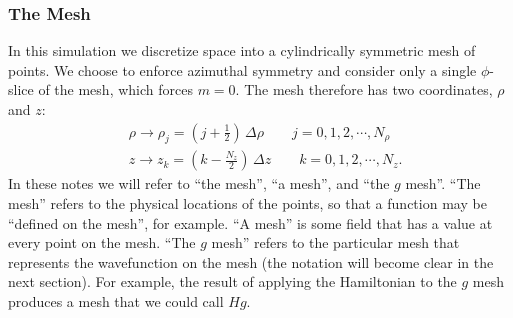 \documentclass[12pt]{article}
\numberwithin{equation}{section}
\begin{document}
\subsubsection{The Mesh}\label{sec:cylindrical_mesh}
In this simulation we discretize space into a cylindrically symmetric mesh of points. We choose to enforce azimuthal symmetry and consider only a single $\phi$-slice of the mesh, which forces $m=0$. The mesh therefore has two coordinates, $\rho$ and $z$:
\begin{align}
&\rho \rightarrow \rho_j = \left(j + \frac{1}{2}\right) \, \Delta \rho \qquad j = 0, 1, 2, \cdots, N_{\rho} \nonumber \\
&z \rightarrow z_k = \left(k - \frac{N_z}{2}\right) \, \Delta z \qquad k = 0, 1, 2, \cdots, N_{z}. \nonumber
\end{align}
In these notes we will refer to ``the mesh'', ``a mesh'', and ``the $g$ mesh''. ``The mesh'' refers to the physical locations of the points, so that a function may be ``defined on the mesh'', for example. ``A mesh'' is some field that has a value at every point on the mesh. ``The $g$ mesh'' refers to the particular mesh that represents the wavefunction on the mesh (the notation will become clear in the next section). For example, the result of applying the Hamiltonian to the $g$ mesh produces a mesh that we could call $Hg$.

\end{document}
